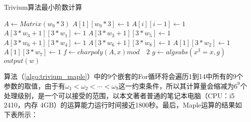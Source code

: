 \begin{breakablealgorithm}
  \caption{Trivium算法最小阶数计算}
  \label{algo:trivium_maple}
  \begin{algorithmic}
    
                      \STATE $A \leftarrow Matrix(w_{9}*3)$
                      \STATE $A[1][w_{9}*3] \leftarrow 1$
                        \STATE $A[i][i - 1] \leftarrow 1$
                      \ENDFOR 
                      \STATE $A[3*w_{3}+1][3*w_{1}] \leftarrow 1$
                      \STATE $A[3*w_{3}+1][3*w_{5}] \leftarrow 1$
                      \STATE $A[3*w_{6}+1][3*w_{4}] \leftarrow 1$
                      \STATE $A[3*w_{6}+1][3*w_{8}] \leftarrow 1$
                      \STATE $A[1][3*w_{2}] \leftarrow 1$
                      \STATE $A[1][3*w_{7}] \leftarrow 1$
                      \STATE $f \leftarrow charpoly(A, x) mod \quad 2$
                        \STATE $g \leftarrow algsubs(x^{3}=x, g)$
                          \STATE $output(w)$
                        \ENDIF
                      \ENDIF
                    \ENDFOR
                  \ENDFOR
                \ENDFOR
              \ENDFOR
            \ENDFOR
          \ENDFOR
        \ENDFOR
      \ENDFOR
    \ENDFOR
    
  \end{algorithmic}
\end{breakablealgorithm}

算法（\ref{algo:trivium_maple}）中的9个嵌套的For循环将会遍历1到14中所有的9个参数的取值，由于有$\omega_{1}<\omega_{2}<\cdots<\omega_{9}$这一约束条件，所以其计算量会缩减为$6^9$个处理级别，是一个可以接受的范围，以本文著者普通的笔记本电脑（CPU：i5 2410，内存 4GB）的运算能力运行时间接近1800秒。最后，Maple运算的结果如下表所示：

